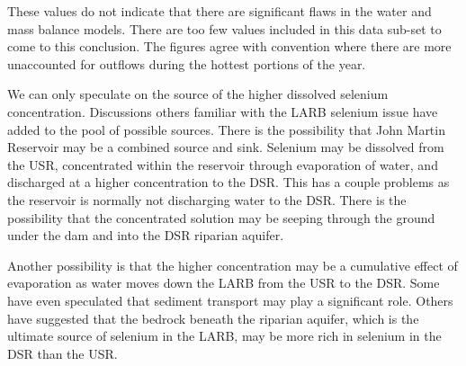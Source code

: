 \begin{linenumbers}
These values do not indicate that there are significant flaws in the water and mass balance models.  There are too few values included in this data sub-set to come to this conclusion.  The figures agree with convention where there are more unaccounted for outflows during the hottest portions of the year.

We can only speculate on the source of the higher dissolved selenium concentration.  Discussions others familiar with the LARB selenium issue have added to the pool of possible sources.  There is the possibility that John Martin Reservoir may be a combined source and sink.  Selenium may be dissolved from the USR, concentrated within the reservoir through evaporation of water, and discharged at a higher concentration to the DSR.  This has a couple problems as the reservoir is normally not discharging water to the DSR.  There is the possibility that the concentrated solution may be seeping through the ground under the dam and into the DSR riparian aquifer.

Another possibility is that the higher concentration may be a cumulative effect of evaporation as water moves down the LARB from the USR to the DSR.  Some have even speculated that sediment transport may play a significant role.  Others have suggested that the bedrock beneath the riparian aquifer, which is the ultimate source of selenium in the LARB, may be more rich in selenium in the DSR than the USR.

\clearpage{}
\end{linenumbers}